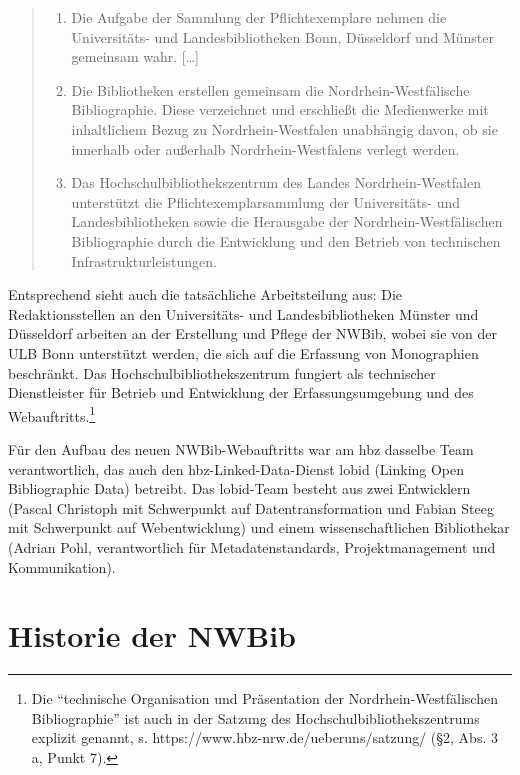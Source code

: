 \documentclass[a4paper,
fontsize=11pt,
oneside,
numbers=noperiodatend,
parskip=half-,
bibliography=totoc,
final
]{scrartcl}
\begin{document}
\begin{quote}
\begin{enumerate}
\def\labelenumi{(\arabic{enumi})}
\item
  Die Aufgabe der Sammlung der Pflichtexemplare nehmen die Uni\-ver\-si\-täts-
  und Landesbibliotheken Bonn, Düsseldorf und Münster gemeinsam wahr.
  {[}\ldots{}{]}
\item
  Die Bibliotheken erstellen gemeinsam die Nord\-rhein-West\-fälische
  Bibliographie. Diese verzeichnet und erschließt die Medienwerke mit
  inhaltlichem Bezug zu Nord\-rhein-West\-falen unabhängig davon, ob sie
  innerhalb oder außerhalb Nord\-rhein-West\-falens verlegt werden.
\item
  Das Hochschulbibliothekszentrum des Landes Nord\-rhein-West\-falen
  unterstützt die Pflichtexemplarsammlung der Uni\-ver\-si\-täts- und
  Landesbibliotheken sowie die Herausgabe der Nord\-rhein-West\-fälischen
  Bibliographie durch die Entwicklung und den Betrieb von technischen
  Infrastrukturleistungen.
\end{enumerate}
\end{quote}

Entsprechend sieht auch die tatsächliche Arbeitsteilung aus: Die
Redaktionsstellen an den Uni\-ver\-si\-täts- und Landesbibliotheken Münster
und Düsseldorf arbeiten an der Erstellung und Pflege der NWBib, wobei
sie von der ULB Bonn unterstützt werden, die sich auf die Erfassung von
Monographien beschränkt. Das Hochschulbibliothekszentrum fungiert als
technischer Dienstleister für Betrieb und Entwicklung der
Erfassungsumgebung und des Webauftritts.\footnote{Die
  \enquote{technische Organisation und Präsentation der
  Nord\-rhein-West\-fälischen Bibliographie} ist auch in der Satzung des
  Hochschulbibliothekszentrums explizit genannt, s.
  https://www.hbz-nrw.de/ueberuns/satzung/ (§2, Abs. 3 a, Punkt 7).}

Für den Aufbau des neuen NWBib-Webauftritts war am hbz dasselbe Team
verantwortlich, das auch den hbz-Linked-Data-Dienst lobid (Linking Open
Bibliographic Data) betreibt. Das lobid-Team besteht aus zwei
Entwicklern (Pascal Christoph mit Schwerpunkt auf Datentransformation
und Fabian Steeg mit Schwerpunkt auf Webentwicklung) und einem
wissenschaftlichen Bibliothekar (Adrian Pohl, verantwortlich für
Metadatenstandards, Projektmanagement und Kommunikation).

\section*{Historie der NWBib}\label{historie-der-nwbib}
\end{document}
